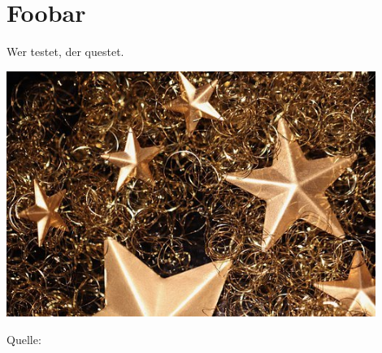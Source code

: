 %
%

\chapter{Foobar}
Wer testet, der questet.\cite{bib:vodafone-legt-in-pirmasens}


\begin{nicepic}
    \includegraphics[width=0.9\textwidth]{images/stars.jpg}
    \caption*{Quelle: \cite{bib:vodafone-legt-in-pirmasens}}
    \label{fig:stars}
\end{nicepic}

